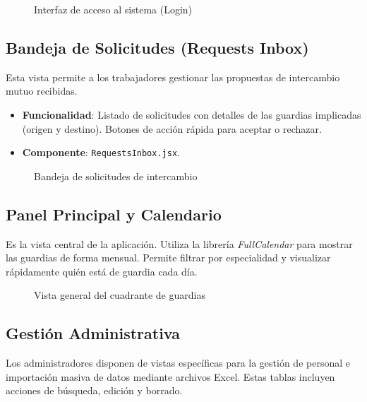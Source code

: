 \begin{figure}[H]
    \centering
    \caption{Interfaz de acceso al sistema (Login)}
    \label{fig:ui-login}
\end{figure}

\subsection{Bandeja de Solicitudes (Requests Inbox)}
Esta vista permite a los trabajadores gestionar las propuestas de intercambio mutuo recibidas.
\begin{itemize}
    \item \textbf{Funcionalidad}: Listado de solicitudes con detalles de las guardias implicadas (origen y destino). Botones de acción rápida para aceptar o rechazar.
    \item \textbf{Componente}: \texttt{RequestsInbox.jsx}.
\end{itemize}

\begin{figure}[H]
    \centering
    \caption{Bandeja de solicitudes de intercambio}
    \label{fig:requests-inbox}
\end{figure}

\subsection{Panel Principal y Calendario}
Es la vista central de la aplicación. Utiliza la librería \textit{FullCalendar} para mostrar las guardias de forma mensual. Permite filtrar por especialidad y visualizar rápidamente quién está de guardia cada día.

\begin{figure}[H]
    \centering
    \caption{Vista general del cuadrante de guardias}
    \label{fig:ui-dashboard}
\end{figure}

\subsection{Gestión Administrativa}
Los administradores disponen de vistas específicas para la gestión de personal e importación masiva de datos mediante archivos Excel. Estas tablas incluyen acciones de búsqueda, edición y borrado.

